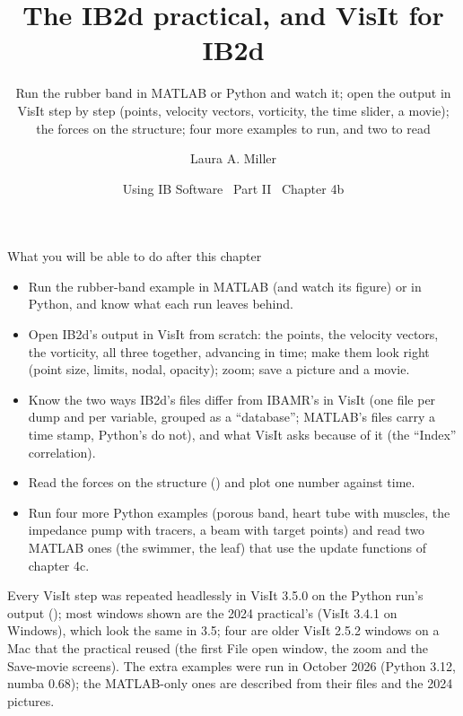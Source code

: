 \documentclass[aspectratio=169,11pt]{beamer}
\title[The IB2d practical; VisIt for IB2d]{The IB2d practical, and VisIt for IB2d}
\subtitle{Run the rubber band in MATLAB or Python and watch it; open the \code{.vtk} output in VisIt step by step (points, velocity vectors, vorticity, the time slider, a movie); the forces on the structure; four more examples to run, and two to read}
\author[Miller]{Laura A. Miller}
\institute[UArizona]{Department of Mathematics, University of Arizona}
\date{Using IB Software \textbullet\ Part II \textbullet\ Chapter 4b}
\begin{document}
\begin{frame}[plain]
\end{frame}

\begin{frame}{What you will be able to do after this chapter}
\label{fr:goals}
\footnotesize
\begin{itemize}\setlength{\itemsep}{0pt}
  \item Run the rubber-band example in MATLAB (and watch its figure) or in Python, and know what each run leaves behind.
  \item Open IB2d's output in VisIt from scratch: the points, the velocity vectors, the vorticity, all three together, advancing in time; make them look right (point size, limits, nodal, opacity); zoom; save a picture and a movie.
  \item Know the two ways IB2d's files differ from IBAMR's in VisIt (one file per dump and per variable, grouped as a ``database''; MATLAB's files carry a time stamp, Python's do not), and what VisIt asks because of it (the ``Index'' correlation).
  \item Read the forces on the structure () and plot one number against time.
  \item Run four more Python examples (porous band, heart tube with muscles, the impedance pump with tracers, a beam with target points) and read two MATLAB ones (the swimmer, the leaf) that use the update functions of chapter 4c.
\end{itemize}
\begin{punchbox}
\footnotesize Every VisIt step was repeated headlessly in VisIt 3.5.0 on the Python run's output (); most windows shown are the 2024 practical's (VisIt 3.4.1 on Windows), which look the same in 3.5; four are older VisIt 2.5.2 windows on a Mac that the practical reused (the first File open window, the zoom and the Save-movie screens). The extra examples were run in October 2026 (Python 3.12, numba 0.68); the MATLAB-only ones are described from their files and the 2024 pictures.
\end{punchbox}
\end{frame}
\end{document}
